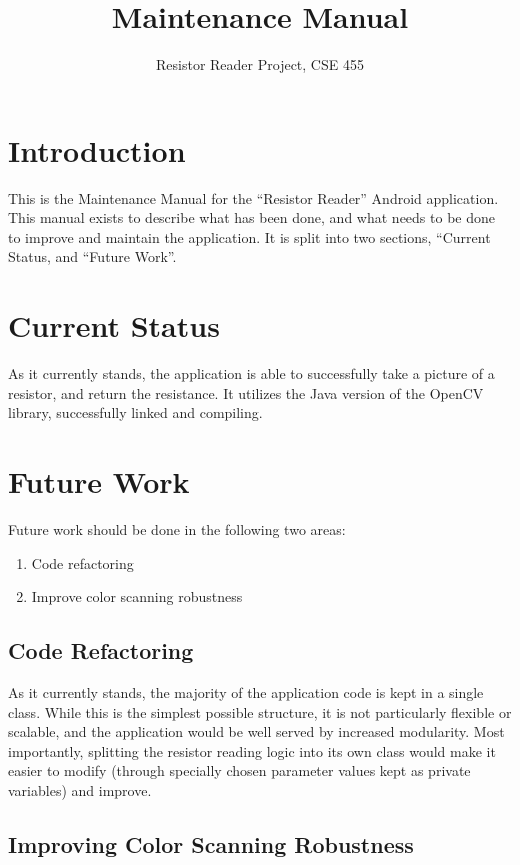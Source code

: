 \documentclass[12pt]{article}
\title{Maintenance Manual}
\author{Resistor Reader Project, CSE 455}
\date{}
\begin{document}
\maketitle

\section{Introduction}

This is the Maintenance Manual for the ``Resistor Reader'' Android application. This manual exists to describe what has been done, and what needs to be done to improve and maintain the application. It is split into two sections, ``Current Status, and ``Future Work''.

\section{Current Status}

As it currently stands, the application is able to successfully take a picture of a resistor, and return the resistance. It utilizes the Java version of the OpenCV library, successfully linked and compiling.

\section{Future Work}

Future work should be done in the following two areas:

\begin{enumerate}
	\item Code refactoring
	\item Improve color scanning robustness
\end{enumerate}

\subsection{Code Refactoring}

As it currently stands, the majority of the application code is kept in a single class. While this is the simplest possible structure, it is not particularly flexible or scalable, and the application would be well served by increased modularity. Most importantly, splitting the resistor reading logic into its own class would make it easier to modify (through specially chosen parameter values kept as private variables) and improve.

\subsection{Improving Color Scanning Robustness}
\end{document}
